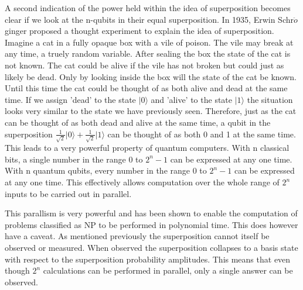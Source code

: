 \documentclass[authoryearcitations]{UoYCSproject}
\begin{document}
A second indication of the power held within the idea of superposition becomes clear if we look at the n-qubits in their equal superposition.
In 1935, Erwin Schr$\ddot{o}$ginger\cite{SchroedingersCat} proposed a thought experiment to explain the idea of superposition.
Imagine a cat in a fully opaque box with a vile of poison.
The vile may break at any time, a truely random variable.
After sealing the box the state of the cat is not known.
The cat could be alive if the vile has not broken but could just as likely be dead.
Only by looking inside the box will the state of the cat be known.
Until this time the cat could be thought of as both alive and dead at the same time.
If we assign 'dead' to the state $\vert0\rangle$ and 'alive' to the state $\vert1\rangle$ the situation looks very similar to the state we have previously seen.
Therefore, just as the cat can be thought of as both dead and alive at the same time, a qubit in the superposition $\frac{1}{\sqrt{2}}\vert0\rangle+\frac{1}{\sqrt{2}}\vert1\rangle$ can be thought of as both 0 and 1 at the same time.
This leads to a very powerful property of quantum computers.
With n classical bits, a single number in the range 0 to $2^n-1$ can be expressed at any one time.
With n quantum qubits, every number in the range 0 to $2^n-1$ can be expressed at any one time.
This effectively allows computation over the whole range of $2^n$ inputs to be carried out in parallel.

This parallism is very powerful and has been shown to enable the computation of problems classified as NP to be performed in polynomial time.
This does however have a caveat.
As mentioned previously the superposition cannot itself be observed or measured.
When observed the superposition collapses to a basis state with respect to the superposition probability amplitudes.
This means that even though $2^n$ calculations can be performed in parallel, only a single answer can be observed.
\end{document}

